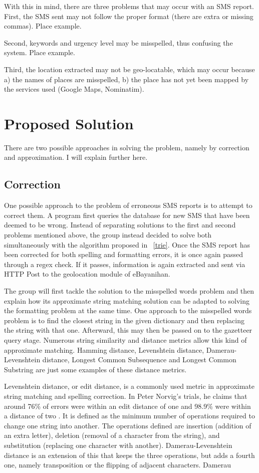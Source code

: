 \documentclass{acm_proc_article-sp}
\begin{document}
With this in mind, there are three problems that may occur with an SMS report.
First, the SMS sent may not follow the proper format (there are extra or missing commas). Place example.

Second, keywords and urgency level may be misspelled, thus confusing the system. Place example.

Third, the location extracted may not be geo-locatable, which may occur because a) the names of places are misspelled, b) the place has not yet been mapped by the services used
(Google Maps, Nominatim).

\section{Proposed Solution}
There are two possible approaches in solving the problem, namely by correction and approximation. I will explain further here.

\subsection{Correction}
One possible approach to the problem of erroneous SMS reports is to attempt to correct them. A program first queries the database for new SMS that have been deemed to be wrong. Instead of separating solutions to the first and second problems mentioned above, the group instead decided to solve both simultaneously with the algorithm proposed in ~\ref{trie}. Once the SMS report has been corrected for both spelling and formatting errors, it is once again passed through a regex check. If it passes, information is again extracted and sent via HTTP Post to the geolocation module of eBayanihan. 

The group will first tackle the solution to the misspelled words problem and then explain how its approximate string matching solution can be adapted to solving the formatting problem at the same time. One approach to the misspelled words problem is to find the closest string in the given dictionary and then replacing the string with that one. Afterward, this may then be passed on to the gazetteer query stage. Numerous string similarity and distance metrics allow this kind of approximate matching. Hamming distance, Levenshtein distance, Damerau-Levenshtein distance, Longest Common Subsequence and Longest Common Substring are just some examples of these distance metrics. 

Levenshtein distance, or edit distance, is a commonly used metric in approximate string matching and spelling correction. In Peter Norvig's trials, he claims that around 76\% of errors were within an edit distance of one and 98.9\% were within a distance of two \cite{norvig:howto}. It is defined as the minimum number of operations required to change one string into another. The operations defined are insertion (addition of an extra letter), deletion (removal of a character from the string), and substitution (replacing one character with another). Damerau-Levenshtein distance is an extension of this that keeps the three operations, but adds a fourth one, namely transposition or the flipping of adjacent characters. Damerau   
\end{document}
